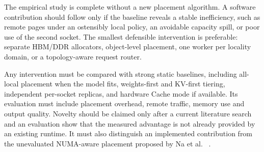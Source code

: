 The empirical study is complete without a new placement algorithm.  A
software contribution should follow only if the baseline reveals a
stable inefficiency, such as remote pages under an ostensibly local
policy, an avoidable capacity spill, or poor use of the second socket.
The smallest defensible intervention is preferable: separate
HBM/DDR allocators, object-level placement, one worker per locality
domain, or a topology-aware request router.

Any intervention must be compared with strong static baselines,
including all-local placement when the model fits, weights-first and
KV-first tiering, independent per-socket replicas, and hardware Cache
mode if available.  Its evaluation must include placement overhead,
remote traffic, memory use and output quality.  Novelty should be
claimed only after a current literature search and an evaluation show
that the measured advantage is not already provided by an existing
runtime.  It must also distinguish an implemented contribution from the
unevaluated NUMA-aware placement proposed by Na et al.
~\cite{na2024llmcpu}.
